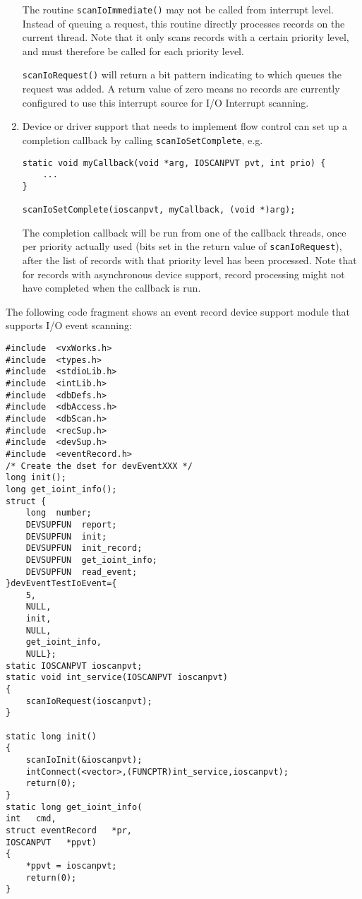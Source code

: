 \begin{enumerate}
The routine \verb|scanIoImmediate()| may not be called from interrupt level.
Instead of queuing a request, this routine directly processes records on the current thread.
Note that it only scans records with a certain priority level,
and must therefore be called for each priority level.

\verb|scanIoRequest()| will return a bit pattern indicating to which queues the request was added.
A return value of zero means no records are currently configured to use this interrupt source for I/O Interrupt scanning.

\item Device or driver support that needs to implement flow control can set up a completion callback by calling \verb|scanIoSetComplete|, e.g.

\begin{verbatim}
static void myCallback(void *arg, IOSCANPVT pvt, int prio) {
    ...
}

scanIoSetComplete(ioscanpvt, myCallback, (void *)arg);
\end{verbatim}

The completion callback will be run from one of the callback threads, once per priority actually used (bits set in the return value of \verb|scanIoRequest|), after the list of records with that priority level has been processed.
Note that for records with asynchronous device support, record processing might not have completed when the callback is run.
\end{enumerate}

The following code fragment shows an event record device support module that supports I/O event scanning: 

\begin{verbatim}
#include  <vxWorks.h>
#include  <types.h>
#include  <stdioLib.h>
#include  <intLib.h>
#include  <dbDefs.h>
#include  <dbAccess.h>
#include  <dbScan.h>
#include  <recSup.h>
#include  <devSup.h>
#include  <eventRecord.h>
/* Create the dset for devEventXXX */
long init();
long get_ioint_info();
struct {
    long  number;
    DEVSUPFUN  report;
    DEVSUPFUN  init;
    DEVSUPFUN  init_record;
    DEVSUPFUN  get_ioint_info;
    DEVSUPFUN  read_event;
}devEventTestIoEvent={
    5,
    NULL,
    init,
    NULL,
    get_ioint_info,
    NULL};
static IOSCANPVT ioscanpvt;
static void int_service(IOSCANPVT ioscanpvt)
{
    scanIoRequest(ioscanpvt);
}

static long init()
{
    scanIoInit(&ioscanpvt);
    intConnect(<vector>,(FUNCPTR)int_service,ioscanpvt);
    return(0);
}
static long get_ioint_info(
int   cmd,
struct eventRecord   *pr,
IOSCANPVT   *ppvt)
{
    *ppvt = ioscanpvt;
    return(0);
}
\end{verbatim}

